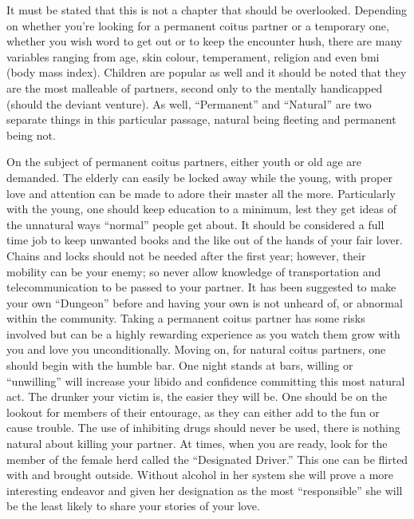 It must be stated that this is not a chapter that should be overlooked. 
Depending on whether you’re looking for a permanent coitus partner or a 
temporary one, whether you wish word to get out or to keep the encounter hush, 
there are many variables ranging from age, skin colour, temperament, religion 
and even bmi (body mass index). Children are popular as well and it should be 
noted that they are the most malleable of partners, second only to the mentally 
handicapped (should the deviant venture). As well, “Permanent” and “Natural” 
are two separate things in this particular passage, natural being fleeting and 
permanent being not.

On the subject of permanent coitus partners, either youth or old age are 
demanded. The elderly can easily be locked away while the young, with proper 
love and attention can be made to adore their master all the more. Particularly 
with the young, one should keep education to a minimum, lest they get ideas of 
the unnatural ways “normal” people get about. It should be considered a full 
time job to keep unwanted books and the like out of the hands of your fair 
lover. Chains and locks should not be needed after the first year; however, 
their mobility can be your enemy; so never allow knowledge of transportation 
and telecommunication to be passed to your partner. It has been suggested to 
make your own “Dungeon” before and having your own is not unheard of, or 
abnormal within the community.  Taking a permanent coitus partner has some 
risks involved but can be a highly rewarding experience as you watch them grow 
with you and love you unconditionally. Moving on, for natural coitus partners, 
one should begin with the humble bar. One night stands at bars, willing or 
“unwilling” will increase your libido and confidence committing this most 
natural act. The drunker your victim is, the easier they will be. One should be 
on the lookout for members of their entourage, as they can either add to the 
fun or cause trouble. The use of inhibiting drugs should never be used, there 
is nothing natural about killing your partner. At times, when you are ready, 
look for the member of the female herd called the “Designated Driver.” This one 
can be flirted with and brought outside. Without alcohol in her system she will 
prove a more interesting endeavor and given her designation as the most 
“responsible” she will be the least likely to share your stories of your love.

